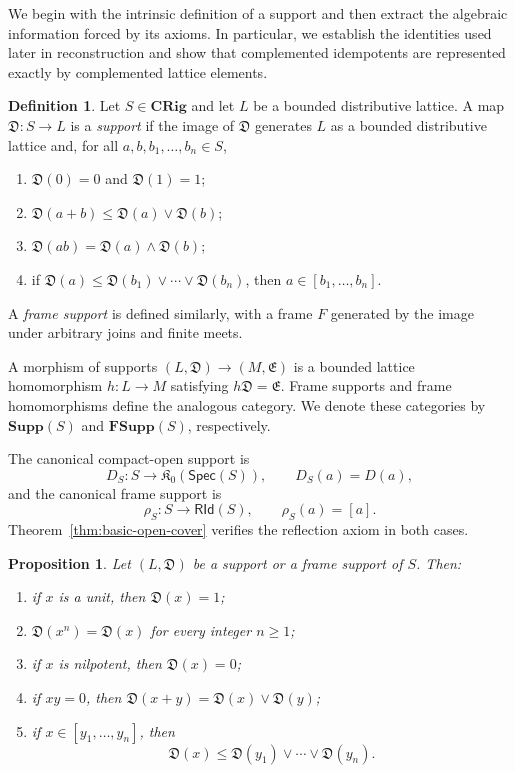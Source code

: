 \documentclass[12pt,leqno]{amsart}
\newcommand{\CRig}{\mathbf{CRig}}
\newcommand{\Supp}{\mathbf{Supp}}
\newcommand{\FSupp}{\mathbf{FSupp}}
\newcommand{\Spec}{\mathsf{Spec}}
\newcommand{\RId}{\mathsf{RId}}
\newcommand{\KOpen}{\mathfrak K_{0}}
\newtheorem{proposition}[theorem]{Proposition}
\theoremstyle{definition}
\newtheorem{definition}{Definition}[section]
\numberwithin{equation}{section}
\theoremstyle{remark}
\def\leq{\leqslant}
\begin{document}
We begin with the intrinsic definition of a support and then extract the algebraic information forced by its axioms. In particular, we establish the identities used later in reconstruction and show that complemented idempotents are represented exactly by complemented lattice elements.

\begin{definition}\label{def:support}
Let \(S\in\CRig\) and let $L$ be a bounded distributive lattice. A map
\(\mathfrak D\colon S\to L\) is a \emph{support} if the image of \(\mathfrak D\) generates $L$ as a bounded distributive lattice and, for all \(a,b,b_1,\ldots,b_n\in S\),
\begin{enumerate}
\item \(\mathfrak D(0)=0\) and \(\mathfrak D(1)=1\);
\item \(\mathfrak D(a+b)\leq\mathfrak D(a)\vee\mathfrak D(b)\);
\item \(\mathfrak D(ab)=\mathfrak D(a)\wedge\mathfrak D(b)\);
\item if
\(\mathfrak D(a)\leq\mathfrak D(b_1)\vee\cdots\vee\mathfrak D(b_n)\), then
\(a\in[b_1,\ldots,b_n]\).
\end{enumerate}
A \emph{frame support} is defined similarly, with a frame $F$ generated by the image under arbitrary joins and finite meets.

A morphism of supports
\((L,\mathfrak D)\to(M,\mathfrak E)\) is a bounded lattice homomorphism
\(h\colon L\to M\) satisfying \(h\mathfrak D=\mathfrak E\). Frame supports and frame homomorphisms define the analogous category. We denote these categories by \(\Supp(S)\) and \(\FSupp(S)\), respectively.
\end{definition}

The canonical compact-open support is
\[
D_S\colon S\longrightarrow\KOpen(\Spec(S)),
\qquad
D_S(a)=D(a),
\]
and the canonical frame support is
\[
\rho_S\colon S\longrightarrow\RId(S),
\qquad
\rho_S(a)=[a].
\]
Theorem~\ref{thm:basic-open-cover} verifies the reflection axiom in both cases.

\begin{proposition}\label{prop:support-properties}
Let \((L,\mathfrak D)\) be a support or a frame support of $S$. Then:
\begin{enumerate}
\item if $x$ is a unit, then \(\mathfrak D(x)=1\);
\item \(\mathfrak D(x^n)=\mathfrak D(x)\) for every integer \(n\geq1\);
\item if $x$ is nilpotent, then \(\mathfrak D(x)=0\);
\item if \(xy=0\), then \(\mathfrak D(x+y)=\mathfrak D(x)\vee\mathfrak D(y)\);
\item if \(x\in[y_1,\ldots,y_n]\), then
\[
\mathfrak D(x)\leq\mathfrak D(y_1)\vee\cdots\vee\mathfrak D(y_n).
\]
\end{enumerate}
\end{proposition}
\end{document}
